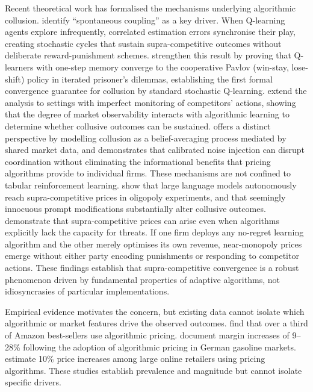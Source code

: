 Recent theoretical work has formalised the mechanisms underlying algorithmic collusion. \citet{BanchioMantegazza2022} identify ``spontaneous coupling'' as a key driver. When Q-learning agents explore infrequently, correlated estimation errors synchronise their play, creating stochastic cycles that sustain supra-competitive outcomes without deliberate reward-punishment schemes. \citet{Bertrand2025} strengthen this result by proving that Q-learners with one-step memory converge to the cooperative Pavlov (win-stay, lose-shift) policy in iterated prisoner's dilemmas, establishing the first formal convergence guarantee for collusion by standard stochastic Q-learning. \citet{Calzolari2021} extend the analysis to settings with imperfect monitoring of competitors' actions, showing that the degree of market observability interacts with algorithmic learning to determine whether collusive outcomes can be sustained. \citet{Zhang2025Noise} offers a distinct perspective by modelling collusion as a belief-averaging process mediated by shared market data, and demonstrates that calibrated noise injection can disrupt coordination without eliminating the informational benefits that pricing algorithms provide to individual firms. These mechanisms are not confined to tabular reinforcement learning. \citet{Fish2024} show that large language models autonomously reach supra-competitive prices in oligopoly experiments, and that seemingly innocuous prompt modifications substantially alter collusive outcomes. \citet{Arunachaleswaran2025} demonstrate that supra-competitive prices can arise even when algorithms explicitly lack the capacity for threats. If one firm deploys any no-regret learning algorithm and the other merely optimises its own revenue, near-monopoly prices emerge without either party encoding punishments or responding to competitor actions. These findings establish that supra-competitive convergence is a robust phenomenon driven by fundamental properties of adaptive algorithms, not idiosyncrasies of particular implementations.

Empirical evidence motivates the concern, but existing data cannot isolate which algorithmic or market features drive the observed outcomes. \citet{Chen2016} find that over a third of Amazon best-sellers use algorithmic pricing. \citet{Assad2020} document margin increases of 9--28\% following the adoption of algorithmic pricing in German gasoline markets. \citet{BrownMacKay2023} estimate 10\% price increases among large online retailers using pricing algorithms. These studies establish prevalence and magnitude but cannot isolate specific drivers.

